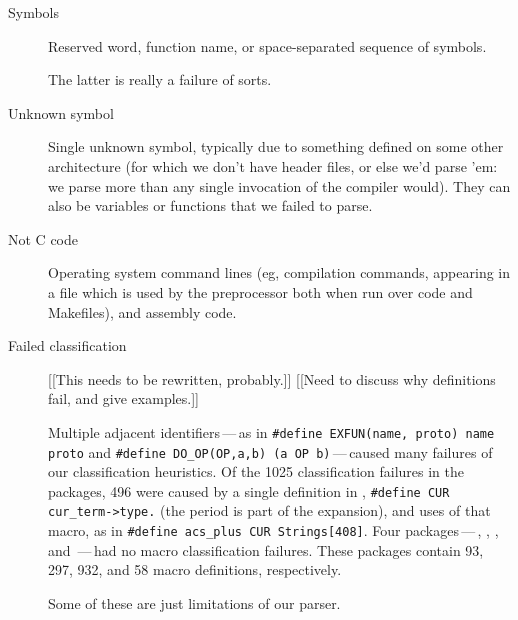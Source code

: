 \begin{description}
\item[Symbols]  Reserved word, function name, or space-separated sequence
of symbols.

The latter is really a failure of sorts.

\item[Unknown symbol]  Single unknown symbol, typically due to something
defined on some other architecture (for which we don't have header files,
or else we'd parse 'em:  we parse more than any single invocation of the
compiler would).  They can also be variables or functions that we failed to
parse.


\item[Not C code]  Operating system command lines (eg, compilation
commands, appearing in a file which is used by the preprocessor both when
run over code and Makefiles), and assembly code.







\item[Failed classification]

  [[This needs to be rewritten, probably.]]
  [[Need to discuss why definitions fail, and give examples.]]

  Multiple adjacent identifiers\,---\,as in
  {\tt \#define EXFUN(name, proto) name proto} and {\tt \#define
  \verb|DO_OP|(OP,a,b) (a OP b)}\,---\,caused many failures of our
  classification heuristics.  Of the 1025 classification failures in the
  {\numpackages} packages, 496 were caused by a single definition in
  , {\tt \#define CUR \verb|cur_term->type.|} (the period is
  part of the expansion), and uses of that macro, as in {\tt \#define
  \verb|acs_plus| CUR Strings[408]}.  Four packages\,---\,,
  , , and \,---\,had no macro
  classification failures.  These packages contain 93, 297, 932, and 58 macro
  definitions, respectively.

  Some of these are just limitations of our parser.



\end{description}
